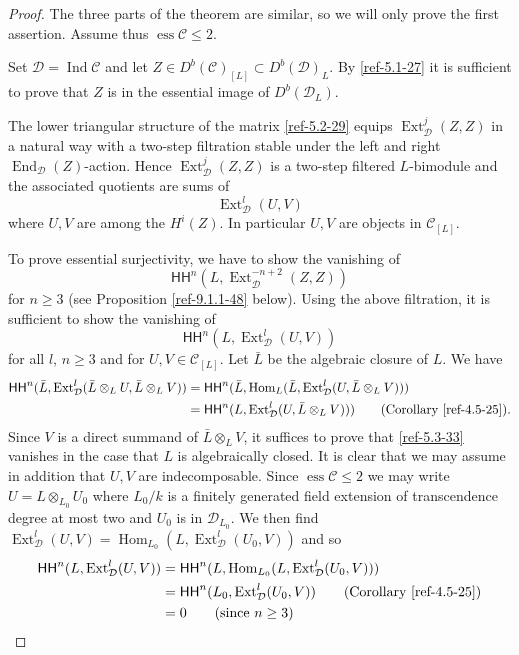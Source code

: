 \documentclass{amsart}
\numberwithin{equation}{section}
\let\cal\mathcal
\theoremstyle{definition}
\theoremstyle{remark}
\begin{document}
\begin{proof} The three parts of the theorem are similar, so we will only prove the
first assertion. Assume thus ${\operatorname{ess}} {{\cal C}}\le 2$. 

Set ${{\cal D}}=\operatorname{Ind} {{\cal C}}$ and let $Z\in D^b({{\cal C}})_{[L]}\subset D^b({{\cal D}})_L$.
By \eqref{ref-5.1-27} it is sufficient to prove that $Z$ is in the essential image
of $D^b({{\cal D}}_L)$.

 The
lower triangular structure of the matrix 
\eqref{ref-5.2-29}
equips ${\operatorname {Ext}}^j_{{\cal D}}(Z,Z)$ in a natural way
with a two-step filtration stable under the left and right ${\operatorname {End}}_{{\cal D}}(Z)$-action.
Hence ${\operatorname {Ext}}^j_{{\cal D}}(Z,Z)$ is a two-step filtered $L$-bimodule and the
associated quotients are sums of 
\[
{\operatorname {Ext}}^l_{{\cal D}}(U,V)
\]
where $U,V$ are among the $H^i(Z)$. In particular $U,V$ are objects in ${{\cal C}}_{[L]}$.

To prove essential surjectivity, we have to show the vanishing of
\[
{\mathsf{HH}}^n(L,{\operatorname {Ext}}^{-n+2}_{{\cal D}}(Z,Z))
\]
for $n\ge 3$ (see Proposition \ref{ref-9.1.1-48} below). Using the above filtration, it is sufficient to show the vanishing of 
\begin{equation}
\label{ref-5.3-33}
{\mathsf{HH}}^n(L,{\operatorname {Ext}}^l_{{\cal D}}(U,V))
\end{equation}
for all $l$, $n\ge 3$ and for $U,V\in {{\cal C}}_{[L]}$.  Let $\bar{L}$ be the algebraic closure of $L$.
We have
\begin{align*}
{\mathsf{HH}}^n(\bar{L},{\operatorname {Ext}}^l_{{\cal D}}(\bar{L}\otimes_L U,\bar{L}\otimes_L V))&
={\mathsf{HH}}^n(\bar{L},{\operatorname {Hom}}_L(\bar{L},{\operatorname {Ext}}^l_{{\cal D}}(U, \bar{L}\otimes_L V)))\\
&={\mathsf{HH}}^n(L,{\operatorname {Ext}}^l_{{\cal D}}(U, \bar{L}\otimes_L V)))\qquad (\text{Corollary \ref{ref-4.5-25}}).
\end{align*}
Since $V$ is a direct summand of $\bar{L}\otimes_L V$, it suffices to prove that \eqref{ref-5.3-33}
vanishes in the case that $L$ is algebraically closed.
It is clear that we may assume
in addition that  $U,V$ are indecomposable.  Since ${\operatorname{ess}} {{\cal C}}\le 2$ we may
write $U=L\otimes_{L_0} U_0$ where $L_0/k$ is a finitely generated field
extension of transcendence degree at most two and $U_0$ is in ${{\cal D}}_{L_0}$. We
then find ${\operatorname {Ext}}^l_{{\cal D}}(U,V)={\operatorname {Hom}}_{L_0}(L,{\operatorname {Ext}}^l_{{\cal D}}(U_0,V))$ and so
\begin{align*}
{\mathsf{HH}}^n(L,{\operatorname {Ext}}^l_{{\cal D}}(U,V))&=
{\mathsf{HH}}^n(L,{\operatorname {Hom}}_{L_0}(L,{\operatorname {Ext}}^l_{{\cal D}}(U_0,V)))\\
&={\mathsf{HH}}^n(L_0,{\operatorname {Ext}}^l_{{\cal D}}(U_0,V))\qquad \text{(Corollary \ref{ref-4.5-25})}\\
&=0 \qquad \text{(since $n\ge 3$)}{}
\end{align*}
\end{proof}
\end{document}

